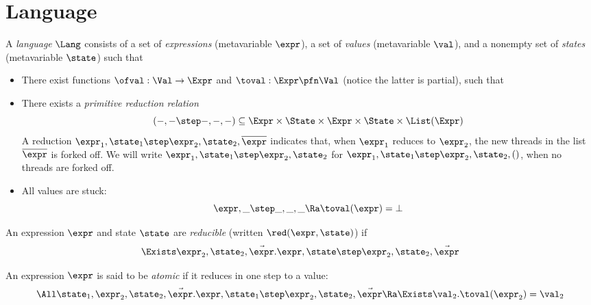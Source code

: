 \section{Language}
\label{sec:language}

A \emph{language} $\Lang$ consists of a set \Expr{} of \emph{expressions} (metavariable $\expr$), a set \Val{} of \emph{values} (metavariable $\val$), and a nonempty set \State of \emph{states} (metavariable $\state$) such that
\begin{itemize}
\item There exist functions $\ofval : \Val \to \Expr$ and $\toval : \Expr \pfn \Val$ (notice the latter is partial), such that
\item There exists a \emph{primitive reduction relation} \[(-,- \step -,-,-) \subseteq \Expr \times \State \times \Expr \times \State \times \List(\Expr)\]
  A reduction $\expr_1, \state_1 \step \expr_2, \state_2, \overline\expr$ indicates that, when $\expr_1$ reduces to $\expr_2$, the new threads in the list $\overline\expr$ is forked off.
  We will write $\expr_1, \state_1 \step \expr_2, \state_2$ for $\expr_1, \state_1 \step \expr_2, \state_2, ()$, \ie when no threads are forked off. \\
\item All values are stuck:
\[ \expr, \_ \step  \_, \_, \_ \Ra \toval(\expr) = \bot \]
\end{itemize}

\begin{defn}
  An expression $\expr$ and state $\state$ are \emph{reducible} (written $\red(\expr, \state)$) if
  \[ \Exists \expr_2, \state_2, \vec\expr. \expr,\state \step \expr_2,\state_2,\vec\expr \]
\end{defn}

\begin{defn}
  An expression $\expr$ is said to be \emph{atomic} if it reduces in one step to a value:
  \[ \All\state_1, \expr_2, \state_2, \vec\expr. \expr, \state_1 \step \expr_2, \state_2, \vec\expr \Ra \Exists \val_2. \toval(\expr_2) = \val_2 \]
\end{defn}

